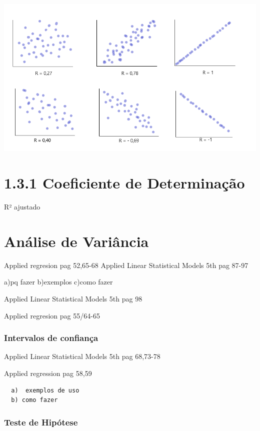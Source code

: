\documentclass[
]{article}
\begin{document}
\includegraphics{images/residuos3.png}

\hypertarget{coeficiente-de-determinauxe7uxe3o}{%
\section{1.3.1 Coeficiente de
Determinação}\label{coeficiente-de-determinauxe7uxe3o}}

R² ajustado

\hypertarget{anuxe1lise-de-variuxe2ncia}{%
\section{Análise de Variância}\label{anuxe1lise-de-variuxe2ncia}}

Applied regresion pag 52,65-68 Applied Linear Statistical Models 5th pag
87-97

a)pq fazer b)exemplos c)como fazer

Applied Linear Statistical Models 5th pag 98

Applied regresion pag 55/64-65

\hypertarget{intervalos-de-confianuxe7a}{%
\subsubsection{Intervalos de
confiança}\label{intervalos-de-confianuxe7a}}

Applied Linear Statistical Models 5th pag 68,73-78

Applied regression pag 58,59

\begin{verbatim}
  a)  exemplos de uso
  b) como fazer
\end{verbatim}

\hypertarget{teste-de-hipuxf3tese}{%
\subsubsection{Teste de Hipótese}\label{teste-de-hipuxf3tese}}
\end{document}
